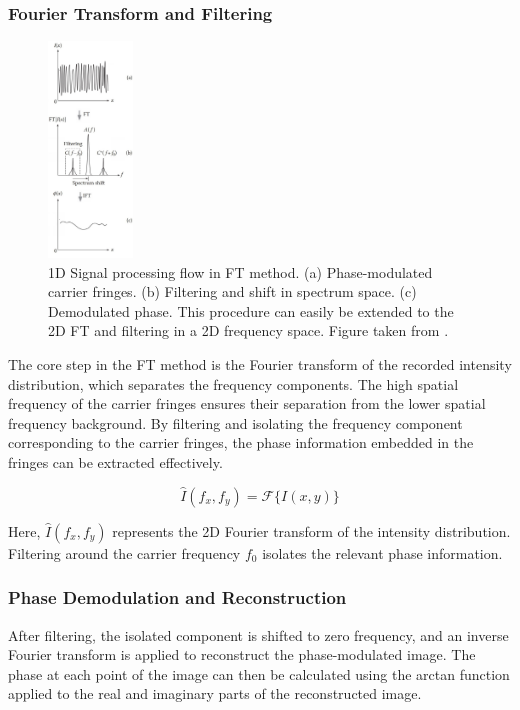 \documentclass[../main.tex]{subfiles}
\begin{document}
\subsubsection{Fourier Transform and Filtering}
\begin{minipage}{\textwidth}
\begin{figure}
    \vspace{-1cm}
    \includegraphics[width=0.2\textwidth]{Images/Introduction/fourier_transform2}
    \vspace{-8pt}
    \caption{1D Signal processing flow in FT method.
    (a) Phase-modulated carrier fringes.
    (b) Filtering and shift in spectrum space.
    (c) Demodulated phase. 
    This procedure can easily be extended to the 2D FT and filtering in a 2D frequency space. Figure taken from \cite{fringe_analysis}.}
    \label{fig:fourier_transform}
\end{figure}
The core step in the FT method is the Fourier transform of the recorded intensity distribution, which separates the frequency components. The high spatial frequency of the carrier fringes ensures their separation from the lower spatial frequency background. By filtering and isolating the frequency component corresponding to the carrier fringes, the phase information embedded in the fringes can be extracted effectively.

\begin{equation}
    \hat{I}(f_x, f_y) = \mathcal{F}\{I(x, y)\}
\end{equation}

Here, \( \hat{I}(f_x, f_y) \) represents the 2D Fourier transform of the intensity distribution. Filtering around the carrier frequency \( f_0 \) isolates the relevant phase information.

\subsubsection{Phase Demodulation and Reconstruction}
After filtering, the isolated component is shifted to zero frequency, and an inverse Fourier transform is applied to reconstruct the phase-modulated image. The phase at each point of the image can then be calculated using the arctan function applied to the real and imaginary parts of the reconstructed image.


\end{minipage}
\end{document}
